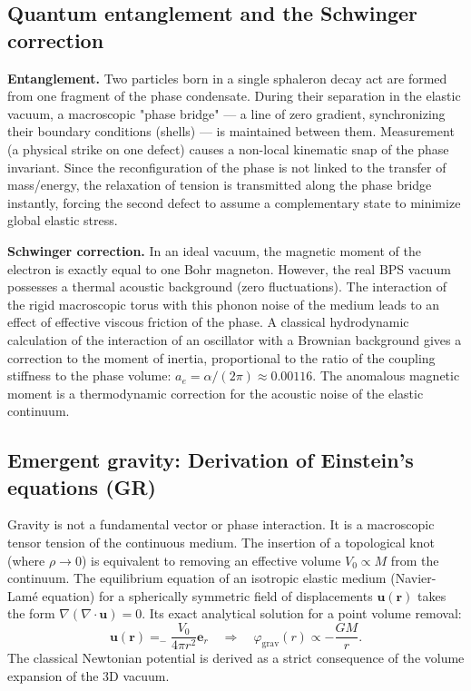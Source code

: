 \documentclass[11pt,a4paper]{article}
\begin{document}
\subsection{Quantum entanglement and the Schwinger correction}
\textbf{Entanglement.} Two particles born in a single sphaleron decay act are formed from one fragment of the phase condensate. During their separation in the elastic vacuum, a macroscopic "phase bridge" — a line of zero gradient, synchronizing their boundary conditions (shells) — is maintained between them. Measurement (a physical strike on one defect) causes a non-local kinematic snap of the phase invariant. Since the reconfiguration of the phase is not linked to the transfer of mass/energy, the relaxation of tension is transmitted along the phase bridge instantly, forcing the second defect to assume a complementary state to minimize global elastic stress.

\textbf{Schwinger correction.} In an ideal vacuum, the magnetic moment of the electron is exactly equal to one Bohr magneton. However, the real BPS vacuum possesses a thermal acoustic background (zero fluctuations). The interaction of the rigid macroscopic torus with this phonon noise of the medium leads to an effect of effective viscous friction of the phase. A classical hydrodynamic calculation of the interaction of an oscillator with a Brownian background gives a correction to the moment of inertia, proportional to the ratio of the coupling stiffness to the phase volume: $a_e = \alpha / (2\pi) \approx 0.00116$. The anomalous magnetic moment is a thermodynamic correction for the acoustic noise of the elastic continuum.

\subsection{Emergent gravity: Derivation of Einstein's equations (GR)}
Gravity is not a fundamental vector or phase interaction. It is a macroscopic tensor tension of the continuous medium. The insertion of a topological knot (where $\rho \to 0$) is equivalent to removing an effective volume $V_0 \propto M$ from the continuum.
The equilibrium equation of an isotropic elastic medium (Navier-Lamé equation) for a spherically symmetric field of displacements $\mathbf{u}(\mathbf{r})$ takes the form $\nabla(\nabla \cdot \mathbf{u}) = 0$. Its exact analytical solution for a point volume removal:
\begin{equation}
\mathbf{u}(\mathbf{r}) =_-\frac{V_0}{4\pi r^2}\mathbf{e}_r \quad \Longrightarrow \quad \varphi_{\text{grav}}(r) \propto -\frac{GM}{r}.
\end{equation}
The classical Newtonian potential is derived as a strict consequence of the volume expansion of the 3D vacuum.
\end{document}
